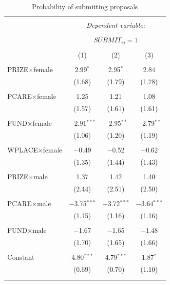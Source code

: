 \documentclass[11pt, titlepage]{article}
\begin{document}
\begin{table}
\centering
\caption{Probability of submitting proposals}\label{tab: probability submitting interactions}
\begin{tabular}{@{\extracolsep{5pt}}lccc} 
\\[-1.8ex]\hline 
\hline \\[-1.8ex] 
 & \multicolumn{3}{c}{\textit{Dependent variable:}} \\ 
\cline{2-4} 
\\[-1.8ex] & \multicolumn{3}{c}{ $SUBMIT_{ij}=1$ } \\ 
\\[-1.8ex] & (1) & (2) & (3)\\ 
\hline \\[-1.8ex] 
 PRIZE$\times$female & 2.99$^{*}$ & 2.95$^{*}$ & 2.84 \\ 
  & (1.68) & (1.79) & (1.78) \\ 
  & & & \\ 
 PCARE$\times$female & 1.25 & 1.21 & 1.08 \\ 
  & (1.57) & (1.61) & (1.61) \\ 
  & & & \\ 
 FUND$\times$female & $-$2.91$^{***}$ & $-$2.95$^{**}$ & $-$2.79$^{**}$ \\ 
  & (1.06) & (1.20) & (1.19) \\ 
  & & & \\ 
 WPLACE$\times$female & $-$0.49 & $-$0.52 & $-$0.62 \\ 
  & (1.35) & (1.44) & (1.43) \\ 
  & & & \\ 
 PRIZE$\times$male & 1.37 & 1.42 & 1.40 \\ 
  & (2.44) & (2.51) & (2.50) \\ 
  & & & \\ 
 PCARE$\times$male & $-$3.75$^{***}$ & $-$3.72$^{***}$ & $-$3.64$^{***}$ \\ 
  & (1.15) & (1.16) & (1.16) \\ 
  & & & \\ 
 FUND$\times$male & $-$1.67 & $-$1.65 & $-$1.48 \\ 
  & (1.70) & (1.65) & (1.66) \\ 
  & & & \\ 
 Constant & 4.80$^{***}$ & 4.79$^{***}$ & 1.87$^{*}$ \\ 
  & (0.69) & (0.70) & (1.10) \\ 
  & & & \\ 
\hline \\[-1.8ex] 

\end{tabular}
\end{table}
\end{document}
